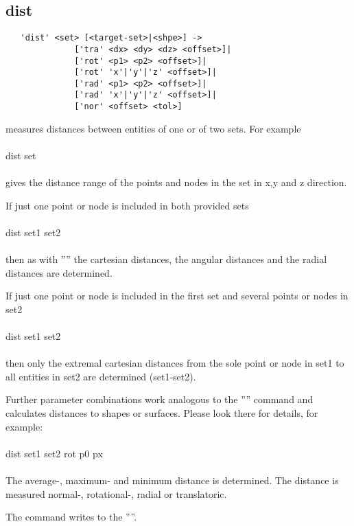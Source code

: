 \documentclass{article}
\begin{document}
\subsection{\label{dist}dist}
\begin{verbatim}
   'dist' <set> [<target-set>|<shpe>] ->
              ['tra' <dx> <dy> <dz> <offset>]|
              ['rot' <p1> <p2> <offset>]|
              ['rot' 'x'|'y'|'z' <offset>]|
              ['rad' <p1> <p2> <offset>]|
              ['rad' 'x'|'y'|'z' <offset>]|
              ['nor' <offset> <tol>]   
\end{verbatim}
measures distances between entities of one or of two sets. For example \\\\
dist set \\\\
gives the distance range of the points and nodes in the set in x,y and z direction.

If just one point or node is included in both provided sets \\\\
dist set1 set2 \\\\
then as with '''' the cartesian distances, the angular distances and the radial distances are determined.

If just one point or node is included in the first set and several points or nodes in set2 \\\\
dist set1 set2 \\\\
then only the extremal cartesian distances from the sole point or node in set1 to all entities in set2 are determined (set1-set2).

Further parameter combinations work analogous to the '''' command and calculates distances to shapes or surfaces. Please look there for details, for example:\\\\
dist set1 set2 rot p0 px \\\\
The average-, maximum- and minimum distance is determined. The distance is measured normal-, rotational-, radial or translatoric. 

The command writes to the ''''.
 
\end{document}
